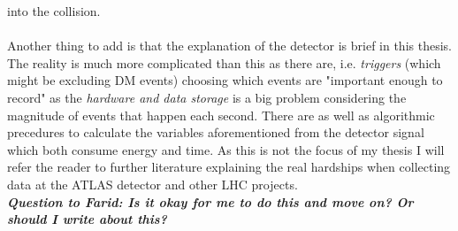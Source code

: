 \documentclass[14pt, a4paper]{book}
\begin{document}
into the collision. \\
\\Another thing to add is that the explanation of the detector is brief in this thesis. The reality is much more complicated than this as there are, i.e. \textit{triggers} (which might be excluding DM events) choosing which events are 
"important enough to record" as the \textit{hardware and data storage} is a big problem considering the magnitude of events that happen each second. There are as well as algorithmic precedures to calculate the variables aforementioned from the detector signal 
which both consume energy and time. As this is not the focus of my thesis I will refer the reader to further literature explaining the real hardships when collecting data at the ATLAS detector and other LHC projects. \\
\textit{\textbf{Question to Farid: Is it okay for me to do this and move on? Or should I write about this?}}
\end{document}
